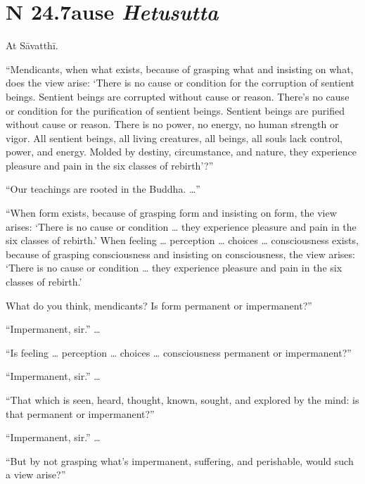 \documentclass[12pt,openany]{book}%
\newcommand*{\suttatitleacronym}[1]{\smaller[2]{#1}\vspace*{.3em}}
\newcommand*{\suttatitletranslation}[1]{\linebreak{#1}}
\newcommand*{\suttatitleroot}[1]{\linebreak\smaller[2]\itshape{#1}}
\newcommand*{\tocacronym}[1]{\hspace*{-3.3em}{#1}\quad}
\newcommand*{\toctranslation}[1]{#1}
\newcommand*{\tocroot}[1]{(\textit{#1})}
\begin{document}
%
\section*{{\suttatitleacronym SN 24.7}{\suttatitletranslation Cause }{\suttatitleroot Hetusutta}}
\addcontentsline{toc}{section}{\tocacronym{SN 24.7} \toctranslation{Cause } \tocroot{Hetusutta}}

At \textsanskrit{Sāvatthī}. 

“Mendicants, when what exists, because of grasping what and insisting on what, does the view arise: ‘There is no cause or condition for the corruption of sentient beings. Sentient beings are corrupted without cause or reason. There’s no cause or condition for the purification of sentient beings. Sentient beings are purified without cause or reason. There is no power, no energy, no human strength or vigor. All sentient beings, all living creatures, all beings, all souls lack control, power, and energy. Molded by destiny, circumstance, and nature, they experience pleasure and pain in the six classes of rebirth’?” 

“Our teachings are rooted in the Buddha. …” 

“When form exists, because of grasping form and insisting on form, the view arises: ‘There is no cause or condition … they experience pleasure and pain in the six classes of rebirth.’ When feeling … perception … choices … consciousness exists, because of grasping consciousness and insisting on consciousness, the view arises: ‘There is no cause or condition … they experience pleasure and pain in the six classes of rebirth.’ 

What do you think, mendicants? Is form permanent or impermanent?” 

“Impermanent, sir.” … 

“Is feeling … perception … choices … consciousness permanent or impermanent?” 

“Impermanent, sir.” … 

“That which is seen, heard, thought, known, sought, and explored by the mind: is that permanent or impermanent?” 

“Impermanent, sir.” … 

“But by not grasping what’s impermanent, suffering, and perishable, would such a view arise?” 
\end{document}
